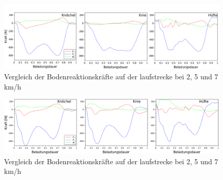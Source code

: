 \begin{figure}[h!]
	\centering
	\includegraphics[width=\linewidth]{bilder/Ergebnisse/ang_inv_kin}
	\caption[Bodenreaktionskräfte]{Vergleich der Bodenreaktionskräfte auf der laufstrecke bei 2, 5 und 7 km/h}
	\label{fig:ang_inv_kin}
\end{figure}

\begin{figure}[h!]
	\centering
	\includegraphics[width=\linewidth]{bilder/Ergebnisse/schn_inv_kin}
	\caption[Bodenreaktionskräfte]{Vergleich der Bodenreaktionskräfte auf der laufstrecke bei 2, 5 und 7 km/h}
	\label{fig:schn_inv_kin}
\end{figure}